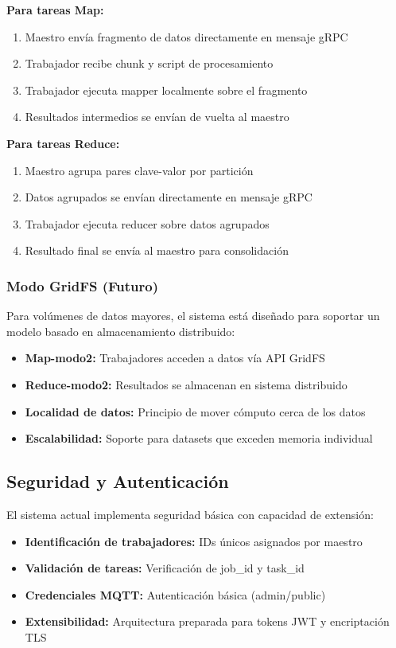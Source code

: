 \textbf{Para tareas Map:}
\begin{enumerate}
    \item Maestro envía fragmento de datos directamente en mensaje gRPC
    \item Trabajador recibe chunk y script de procesamiento
    \item Trabajador ejecuta mapper localmente sobre el fragmento
    \item Resultados intermedios se envían de vuelta al maestro
\end{enumerate}

\textbf{Para tareas Reduce:}
\begin{enumerate}
    \item Maestro agrupa pares clave-valor por partición
    \item Datos agrupados se envían directamente en mensaje gRPC
    \item Trabajador ejecuta reducer sobre datos agrupados
    \item Resultado final se envía al maestro para consolidación
\end{enumerate}

\subsubsection{Modo GridFS (Futuro)}

Para volúmenes de datos mayores, el sistema está diseñado para soportar un modelo basado en almacenamiento distribuido:

\begin{itemize}
    \item \textbf{Map-modo2:} Trabajadores acceden a datos vía API GridFS
    \item \textbf{Reduce-modo2:} Resultados se almacenan en sistema distribuido
    \item \textbf{Localidad de datos:} Principio de mover cómputo cerca de los datos
    \item \textbf{Escalabilidad:} Soporte para datasets que exceden memoria individual
\end{itemize}

\subsection{Seguridad y Autenticación}

El sistema actual implementa seguridad básica con capacidad de extensión:

\begin{itemize}
    \item \textbf{Identificación de trabajadores:} IDs únicos asignados por maestro
    \item \textbf{Validación de tareas:} Verificación de job\_id y task\_id
    \item \textbf{Credenciales MQTT:} Autenticación básica (admin/public)
    \item \textbf{Extensibilidad:} Arquitectura preparada para tokens JWT y encriptación TLS
\end{itemize}
